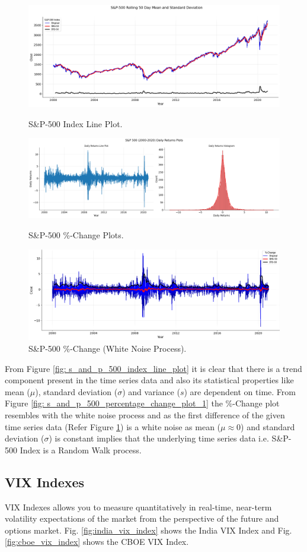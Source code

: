\documentclass[conference]{IEEEtran}
\begin{document}
\begin{figure}[htbp]
	\centering
	\includegraphics[width = 0.52 \textwidth]{images/S&P-500 Line Plot.png}
	\caption{S\&P-500 Index Line Plot.}
	\label{fig: s_and_p_500_index_line_plot}
	\includegraphics[width = 0.51 \textwidth]{images/S&P-500 Change Plot.png}
	\caption{S\&P-500 \%-Change Plots.}
	\label{fig: s_and_p_500_percentage_change_plot_1}
	\includegraphics[width = 0.51 \textwidth]{images/S&P-500 White Noise Part.png}
	\caption{S\&P-500 \%-Change (White Noise Process).}
	\label{fig: s_and_p_500_percentage_change_plot_2}
\end{figure}
From Figure \ref{fig: s_and_p_500_index_line_plot} it is clear that there is a  trend component present in the time series data and also its statistical properties like mean ($\mu$), standard deviation ($\sigma$) and variance ($s$) are dependent on time.
From Figure \ref{fig: s_and_p_500_percentage_change_plot_1} the \%-Change plot resembles with the white noise process and as the first difference of the given time series data (Refer Figure \ref{fig: s_and_p_500_percentage_change_plot_2}) is a white noise as mean ($\mu \approx 0$) and standard deviation ($\sigma$) is constant implies that the underlying time series data i.e. S\&P-500 Index is a Random Walk process.

\subsection{VIX Indexes}
VIX Indexes allows you to measure quantitatively in real-time, near-term volatility expectations of the market from the perspective of the future and options market. Fig. \ref{fig:india_vix_index} shows the India VIX Index and Fig. \ref{fig:cboe_vix_index} shows the CBOE VIX Index.
\end{document}
